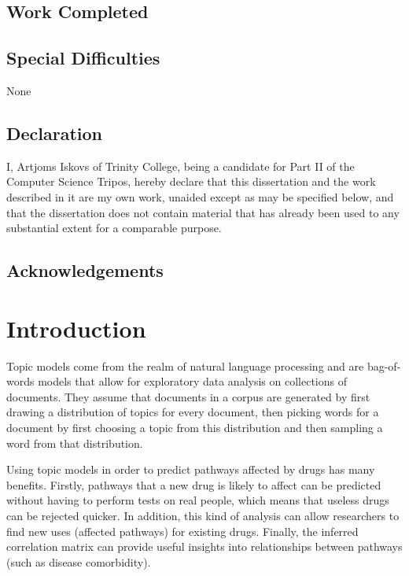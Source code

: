 \documentclass[12pt,a4paper,twoside,openright]{report}
\begin{document}
\section*{Work Completed}

\section*{Special Difficulties}
None
 
\newpage
\section*{Declaration}

I, Artjoms Iskovs of Trinity College, being a candidate for Part II of the Computer
Science Tripos, hereby declare that this dissertation and the work described in it are my own work,
unaided except as may be specified below, and that the dissertation does not contain material that has already been used to any substantial
extent for a comparable purpose.

\bigskip
{}

\medskip
{}

\tableofcontents

\listoffigures

\newpage
\section*{Acknowledgements}



\pagestyle{headings}

\chapter{Introduction}

Topic models come from the realm of natural language processing and are bag-of-words models that allow for exploratory data analysis on collections of documents. They assume that documents in a corpus are generated by first drawing a distribution of topics for every document, then picking words for a document by first choosing a topic from this distribution and then sampling a word from that distribution.

Using topic models in order to predict pathways affected by drugs has many benefits. Firstly, pathways that a new drug is likely to affect can be predicted without having to perform tests on real people, which means that useless drugs can be rejected quicker. In addition, this kind of analysis can allow researchers to find new uses (affected pathways) for existing drugs. Finally, the inferred correlation matrix can provide useful insights into relationships between pathways (such as disease comorbidity).
\end{document}
